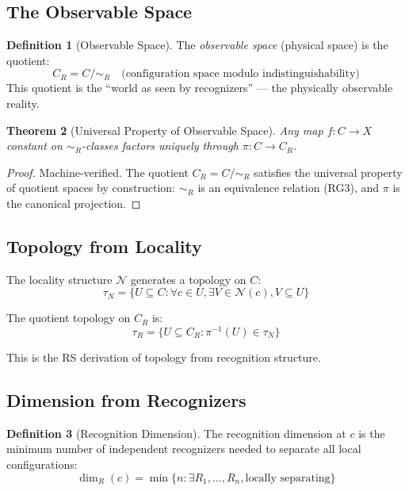 \documentclass[12pt,a4paper]{article}
\newtheorem{theorem}{Theorem}[section]
\theoremstyle{definition}
\newtheorem{definition}[theorem]{Definition}
\theoremstyle{remark}
\begin{document}
\subsection{The Observable Space}

\begin{definition}[Observable Space]
The \emph{observable space} (physical space) is the quotient:
\begin{equation}
C_R = C / \sim_R \quad \text{(configuration space modulo indistinguishability)}
\end{equation}
This quotient is the ``world as seen by recognizers'' --- the physically observable reality.
\end{definition}

\begin{theorem}[Universal Property of Observable Space]
Any map $f: C \to X$ constant on $\sim_R$-classes 
factors uniquely through $\pi: C \to C_R$.
\end{theorem}

\begin{proof}
Machine-verified. The quotient $C_R = C/{\sim_R}$ satisfies the universal property of quotient spaces by construction: $\sim_R$ is an equivalence relation (RG3), and $\pi$ is the canonical projection.
\end{proof}

\subsection{Topology from Locality}

The locality structure $\mathcal{N}$ generates a topology on $C$:
\begin{equation}
\tau_N = \{U \subseteq C : \forall c \in U, \exists V \in \mathcal{N}(c), V \subseteq U\}
\end{equation}

The quotient topology on $C_R$ is:
\begin{equation}
\tau_R = \{U \subseteq C_R : \pi^{-1}(U) \in \tau_N\}
\end{equation}

This is the RS derivation of topology from recognition structure.

\subsection{Dimension from Recognizers}

\begin{definition}[Recognition Dimension]
The recognition dimension at $c$ is the 
minimum number of independent recognizers needed to separate all local configurations:
\begin{equation}
\dim_R(c) = \min\{n : \exists R_1, \ldots, R_n, \text{locally separating}\}
\end{equation}
\end{definition}
\end{document}
